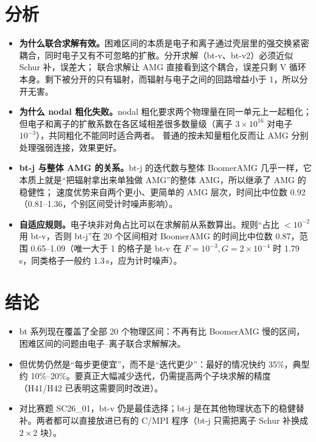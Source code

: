 \documentclass[11pt,a4paper]{ctexart}
\begin{document}
\section{分析}
\begin{itemize}
\item \textbf{为什么联合求解有效。}困难区间的本质是电子和离子通过壳层里的强交换紧密耦合，同时电子又有不可忽略的扩散。分开求解（bt-v、bt-v2）必须近似 Schur 补，误差大；
联合求解让 AMG 直接看到这个耦合，误差只剩 V 循环本身。剩下被分开的只有辐射，而辐射与电子之间的回路增益小于 1，所以分开无害。
\item \textbf{为什么 nodal 粗化失败。}nodal 粗化要求两个物理量在同一单元上一起粗化；但电子和离子的扩散系数在各区域相差很多数量级（离子 $3\times10^{16}$ 对电子 $10^{-3}$），共同粗化不能同时适合两者。
普通的按未知量粗化反而让 AMG 分别处理强弱连接，效果更好。
\item \textbf{bt-j 与整体 AMG 的关系。}bt-j 的迭代数与整体 BoomerAMG 几乎一样，它本质上就是“把辐射拿出来单独做 AMG”的整体 AMG，所以继承了 AMG 的稳健性；
速度优势来自两个更小、更简单的 AMG 层次，时间比中位数 0.92（0.81--1.36，个别区间受计时噪声影响）。
\item \textbf{自适应规则。}电子块非对角占比可以在求解前从系数算出。规则“占比 $<10^{-2}$ 用 bt-v，否则 bt-j”在 20 个区间相对 BoomerAMG 的时间比中位数 0.87，范围 0.65--1.09（唯一大于 1 的格子是 bt-v 在 $F=10^{-3},G=2\times10^{-4}$ 时 1.79\,s，同类格子一般约 1.3\,s，应为计时噪声）。
\end{itemize}

\section{结论}
\begin{itemize}
\item bt 系列现在覆盖了全部 20 个物理区间：不再有比 BoomerAMG 慢的区间，困难区间的问题由电子--离子联合求解解决。
\item 但优势仍然是“每步更便宜”，而不是“迭代更少”：最好的情况快约 35\%，典型约 10\%--20\%。要真正大幅减少迭代，仍需提高两个子块求解的精度（H41/H42 已表明这需要同时改进）。
\item 对比赛题 SC26\_01，bt-v 仍是最佳选择；bt-j 是在其他物理状态下的稳健替补。两者都可以直接放进已有的 C/MPI 程序（bt-j 只需把离子 Schur 补换成 $2\times2$ 块）。
\end{itemize}
\end{document}
